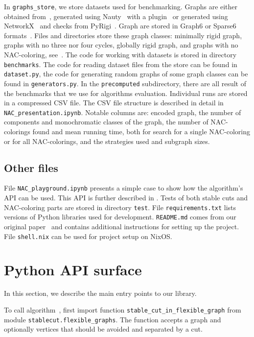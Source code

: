 In \texttt{graphs\_store}, we store datasets used for benchmarking.
Graphs are either obtained from~\cite{extremal_graphs},
generated using Nauty~\cite{nauty} with a plugin~\cite{nauty_plugin}
or generated using NetworkX~\cite{networkx} and checks from PyRigi~\cite{pyrigi}.
Graph are stored in Graph6 or Sparse6 formats~\cite{graph6}.
%
Files and directories store these graph classes:
minimally rigid graph, graphs with no three nor four cycles, globally rigid graph,
and graphs with no NAC-coloring, see~.
%
The code for working with datasets is stored in directory \texttt{benchmarks}.
The code for reading dataset files from the store can be found in \texttt{dataset.py},
the code for generating random graphs of some graph classes
can be found in \texttt{generators.py}.
%
In the \texttt{precomputed} subdirectory, there are all result of the benchmarks that
we use for algorithms evaluation.
Individual runs are stored in a compressed CSV file.
The CSV file structure is described in detail in \texttt{NAC\_presentation.ipynb}.
Notable columns are:
encoded graph,
the number of \trcon{} components and monochromatic classes of the graph,
the number of NAC-colorings found and mean running time,
both for search for a single NAC-coloring or for all NAC-colorings,
and the strategies used and subgraph sizes.


\subsection{Other files}

File \texttt{NAC\_playground.ipynb} presents a simple case
to show how the algorithm's API can be used.
This API is further described in .
%
Tests of both stable cuts and NAC-coloring parts are stored in directory \texttt{test}.
%
File \texttt{requirements.txt} lists versions of Python libraries used for development.
\texttt{README.md} comes from our original paper~\cite{my_paper}
and contains additional instructions for setting up the project.
File \texttt{shell.nix} can be used for project setup on NixOS\@.


\section{Python API surface}%
\label{sec:impl_python_api}

In this section,
we describe the main entry points to our library.

To call algorithm~,
first import function \texttt{stable\_cut\_in\_flexible\_graph}
from module \texttt{stablecut.flexible\_graphs}.
The function accepts a graph and
optionally vertices that should be avoided and separated by a cut.

